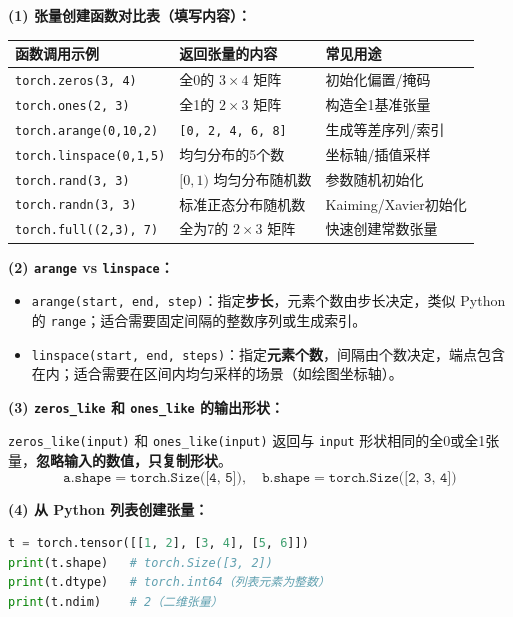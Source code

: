 \documentclass[a4paper,11pt]{ctexart}
\begin{document}
\begin{solutionbox}[参考答案与详细解析]
    \textbf{(1) 张量创建函数对比表（填写内容）：}

    \begin{center}
    \begin{tabular}{p{3.5cm} p{4.5cm} p{4.0cm}}
        \toprule
        函数调用示例 & 返回张量的内容 & 常见用途 \\
        \midrule
        \texttt{torch.zeros(3, 4)} & 全0的 $3\times4$ 矩阵 & 初始化偏置/掩码 \\[0.8em]
        \texttt{torch.ones(2, 3)} & 全1的 $2\times3$ 矩阵 & 构造全1基准张量 \\[0.8em]
        \texttt{torch.arange(0,10,2)} & \texttt{[0, 2, 4, 6, 8]} & 生成等差序列/索引 \\[0.8em]
        \texttt{torch.linspace(0,1,5)} & 均匀分布的5个数 & 坐标轴/插值采样 \\[0.8em]
        \texttt{torch.rand(3, 3)} & $[0,1)$ 均匀分布随机数 & 参数随机初始化 \\[0.8em]
        \texttt{torch.randn(3, 3)} & 标准正态分布随机数 & Kaiming/Xavier初始化 \\[0.8em]
        \texttt{torch.full((2,3), 7)} & 全为7的 $2\times3$ 矩阵 & 快速创建常数张量 \\
        \bottomrule
    \end{tabular}
    \end{center}

    \textbf{(2) \texttt{arange} vs \texttt{linspace}：}

    \begin{itemize}
        \item \texttt{arange(start, end, step)}：指定\textbf{步长}，元素个数由步长决定，类似 Python 的 \texttt{range}；适合需要固定间隔的整数序列或生成索引。
        \item \texttt{linspace(start, end, steps)}：指定\textbf{元素个数}，间隔由个数决定，端点包含在内；适合需要在区间内均匀采样的场景（如绘图坐标轴）。
    \end{itemize}

    \textbf{(3) \texttt{zeros\_like} 和 \texttt{ones\_like} 的输出形状：}

    \texttt{zeros\_like(input)} 和 \texttt{ones\_like(input)} 返回与 \texttt{input} 形状相同的全0或全1张量，\textbf{忽略输入的数值，只复制形状}。
    \[
    \texttt{a.shape} = \texttt{torch.Size([4, 5])}, \quad \texttt{b.shape} = \texttt{torch.Size([2, 3, 4])}
    \]

    \textbf{(4) 从 Python 列表创建张量：}
    \begin{lstlisting}[language=Python]
t = torch.tensor([[1, 2], [3, 4], [5, 6]])
print(t.shape)   # torch.Size([3, 2])
print(t.dtype)   # torch.int64（列表元素为整数）
print(t.ndim)    # 2（二维张量）
    \end{lstlisting}


\end{solutionbox}
\end{document}
